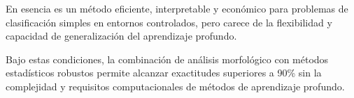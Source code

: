 En esencia es un método eficiente, interpretable y económico para problemas de clasificación simples en entornos controlados, pero carece de la flexibilidad y capacidad de generalización del aprendizaje profundo.

Bajo estas condiciones, la combinación de análisis morfológico con métodos estadísticos robustos permite alcanzar exactitudes superiores a 90\% sin la complejidad y requisitos computacionales de métodos de aprendizaje profundo.

